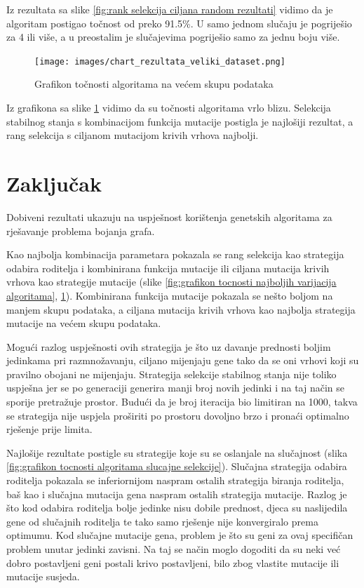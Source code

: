 \documentclass[times, utf8, zavrsni]{fer}
\begin{document}
Iz rezultata sa slike \ref{fig:rank selekcija ciljana random rezultati}  vidimo da je algoritam postigao točnost od preko 91.5\%. U samo jednom slučaju je pogriješio za 4 ili više, a u preostalim je slučajevima pogriješio samo za jednu boju više.

\begin{figure}[h]
\centering
\texttt{[image: images/chart\_rezultata\_veliki\_dataset.png]}
\caption{Grafikon točnosti algoritama na većem skupu podataka}
\label{fig:grafikon na vecem skupu podataka}
\end{figure}

Iz grafikona sa slike \ref{fig:grafikon na vecem skupu podataka} vidimo da su točnosti algoritama vrlo blizu. Selekcija stabilnog stanja s kombinacijom funkcija mutacije postigla je najlošiji rezultat, a rang selekcija s ciljanom mutacijom krivih vrhova najbolji.

\chapter{Zaključak}
Dobiveni rezultati ukazuju na uspješnost korištenja genetskih algoritama za rješavanje problema bojanja grafa.

Kao najbolja kombinacija parametara pokazala se rang selekcija kao strategija odabira roditelja i kombinirana funkcija mutacije ili ciljana mutacija krivih vrhova kao strategije mutacije (slike \ref{fig:grafikon tocnosti najboljih varijacija algoritama}, \ref{fig:grafikon na vecem skupu podataka}). Kombinirana funkcija mutacije pokazala se nešto boljom na manjem skupu podataka, a ciljana mutacija krivih vrhova kao najbolja strategija mutacije na većem skupu podataka.

Mogući razlog uspješnosti ovih strategija je što uz davanje prednosti boljim jedinkama pri razmnožavanju, ciljano mijenjaju gene tako da se oni vrhovi koji su pravilno obojani ne mijenjaju. Strategija selekcije stabilnog stanja nije toliko uspješna jer se po generaciji generira manji broj novih jedinki i na taj način se sporije pretražuje prostor. Budući da je broj iteracija bio limitiran na 1000, takva se strategija nije uspjela proširiti po prostoru dovoljno brzo i pronaći optimalno rješenje prije limita.

Najlošije rezultate postigle su strategije koje su se oslanjale na slučajnost (slika \ref{fig:grafikon tocnosti algoritama slucajne selekcije}). Slučajna strategija odabira roditelja pokazala se inferiornijom naspram ostalih strategija biranja roditelja, baš kao i slučajna mutacija gena naspram ostalih strategija mutacije. Razlog je što kod odabira roditelja bolje jedinke nisu dobile prednost, djeca su naslijedila gene od slučajnih roditelja te tako samo rješenje nije konvergiralo prema optimumu. Kod slučajne mutacije gena, problem je što su geni za ovaj specifičan problem unutar jedinki zavisni. Na taj se način moglo dogoditi da su neki već dobro postavljeni geni postali krivo postavljeni, bilo zbog vlastite mutacije ili mutacije susjeda.
\end{document}
